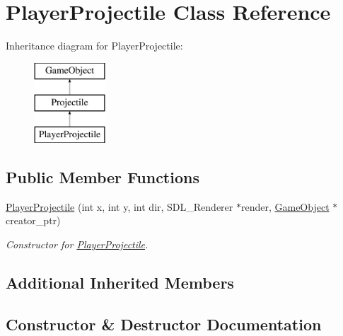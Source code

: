 \hypertarget{class_player_projectile}{}\section{Player\+Projectile Class Reference}
\label{class_player_projectile}
Inheritance diagram for Player\+Projectile\+:\begin{figure}[H]
\begin{center}
\leavevmode
\includegraphics[height=3.000000cm]{class_player_projectile}
\end{center}
\end{figure}
\subsection*{Public Member Functions}
\begin{DoxyCompactItemize}
\item 
\hyperlink{class_player_projectile_a500160841d1cd4fd7085448cb8766989}{Player\+Projectile} (int x, int y, int dir, S\+D\+L\+\_\+\+Renderer $\ast$render, \hyperlink{class_game_object}{Game\+Object} $\ast$creator\+\_\+ptr)
\begin{DoxyCompactList}\small\item\em Constructor for \hyperlink{class_player_projectile}{Player\+Projectile}. \end{DoxyCompactList}\end{DoxyCompactItemize}
\subsection*{Additional Inherited Members}


\subsection{Constructor \& Destructor Documentation}
\hypertarget{class_player_projectile_a500160841d1cd4fd7085448cb8766989}{}
